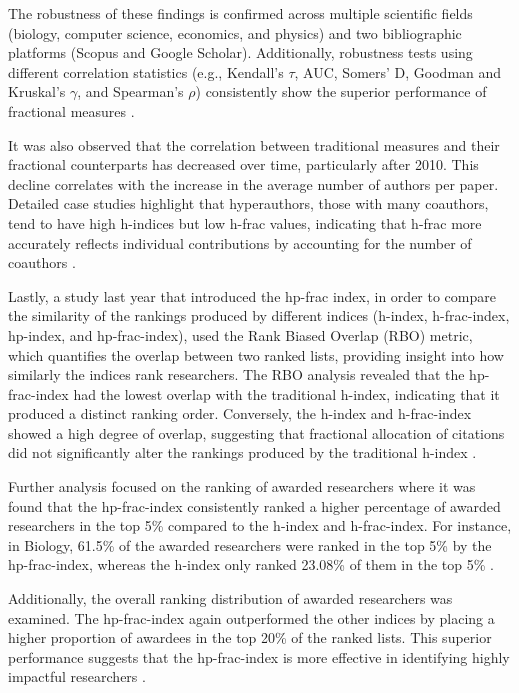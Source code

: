 The robustness of these findings is confirmed across multiple scientific fields
(biology, computer science, economics, and physics) and two bibliographic
platforms (Scopus and Google Scholar). Additionally, robustness tests using
different correlation statistics (e.g., Kendall’s $\tau$, AUC, Somers’ D,
Goodman and Kruskal’s $\gamma$, and Spearman’s $\rho$) consistently show the
superior performance of fractional measures \cite{koltun2021h}.

It was also observed that the correlation between traditional measures and
their fractional counterparts has decreased over time, particularly after 2010.
This decline correlates with the increase in the average number of authors per
paper. Detailed case studies highlight that hyperauthors, those with many
coauthors, tend to have high h-indices but low h-frac values, indicating that
h-frac more accurately reflects individual contributions by accounting for the
number of coauthors \cite{koltun2021h}.

Lastly, a study last year that introduced the hp-frac index, in order to
compare the similarity of the rankings produced by different indices (h-index,
h-frac-index, hp-index, and hp-frac-index), used the Rank Biased Overlap (RBO)
metric, which quantifies the overlap between two ranked lists, providing
insight into how similarly the indices rank researchers. The RBO analysis
revealed that the hp-frac-index had the lowest overlap with the traditional
h-index, indicating that it produced a distinct ranking order. Conversely, the
h-index and h-frac-index showed a high degree of overlap, suggesting that
fractional allocation of citations did not significantly alter the rankings
produced by the traditional h-index \cite{singhal2023hp}.

Further analysis focused on the ranking of awarded researchers where it was
found that the hp-frac-index consistently ranked a higher percentage of awarded
researchers in the top 5\% compared to the h-index and h-frac-index. For
instance, in Biology, 61.5\% of the awarded researchers were ranked in the top
5\% by the hp-frac-index, whereas the h-index only ranked 23.08\% of them in
the top 5\% \cite{singhal2023hp}.

Additionally, the overall ranking distribution of awarded researchers was
examined. The hp-frac-index again outperformed the other indices by placing a
higher proportion of awardees in the top 20\% of the ranked lists. This
superior performance suggests that the hp-frac-index is more effective in
identifying highly impactful researchers \cite{singhal2023hp}.

